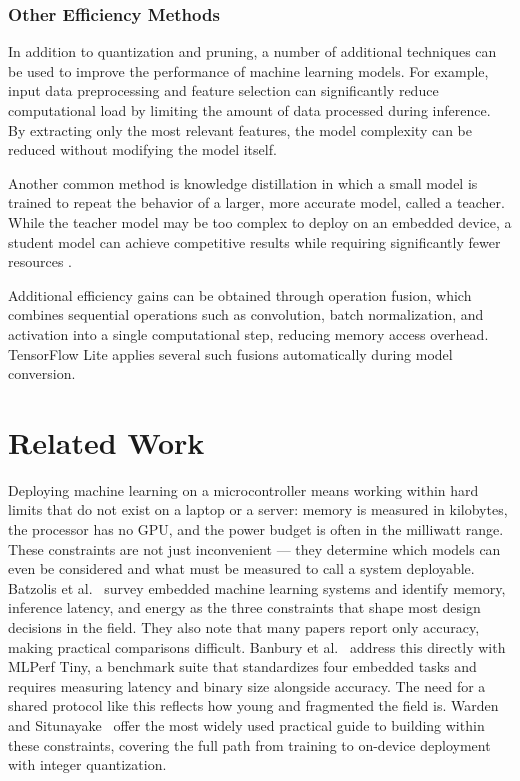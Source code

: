 \subsection{Other Efficiency Methods}

In addition to quantization and pruning, a number of additional techniques can be used to improve the performance of machine learning models. For example, input data preprocessing and feature selection can significantly reduce computational load by limiting the amount of data processed during inference. By extracting only the most relevant features, the model complexity can be reduced without modifying the model itself.

Another common method is knowledge distillation in which a small model is trained to repeat the behavior of a larger, more accurate model, called a teacher. While the teacher model may be too complex to deploy on an embedded device, a student model can achieve competitive results while requiring significantly fewer resources \cite{hinton2015distillation}. 

Additional efficiency gains can be obtained through operation fusion, which combines sequential operations such as convolution, batch normalization, and activation into a single computational step, reducing memory access overhead. TensorFlow Lite applies several such fusions automatically during model conversion.

\chapter{Related Work}
\label{chap:related_work}

Deploying machine learning on a microcontroller means working within hard limits that do not exist on a laptop or a server: memory is measured in kilobytes, the processor has no GPU, and the power budget is often in the milliwatt range. These constraints are not just inconvenient --- they determine which models can even be considered and what must be measured to call a system deployable. Batzolis et al.~\cite{batzolis2023ml} survey embedded machine learning systems and identify memory, inference latency, and energy as the three constraints that shape most design decisions in the field. They also note that many papers report only accuracy, making practical comparisons difficult. Banbury et al.~\cite{banbury2021mlperftiny} address this directly with MLPerf Tiny, a benchmark suite that standardizes four embedded tasks and requires measuring latency and binary size alongside accuracy. The need for a shared protocol like this reflects how young and fragmented the field is. Warden and Situnayake~\cite{warden2019tinyml} offer the most widely used practical guide to building within these constraints, covering the full path from training to on-device deployment with integer quantization. 

